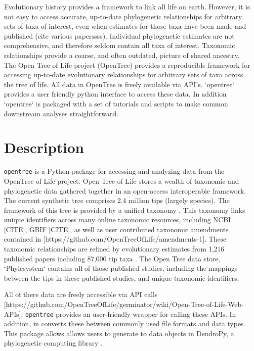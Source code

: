 \documentclass[oupdraft]{sysbio_sse}
\begin{document}
Evolutionary history provides a framework to link all life on earth. However, it is not easy to access accurate, up-to-date phylogenetic relationships for arbitrary sets of taxa of interest, even when estimates for those taxa have been made and published (cite various paperssss). Individual phylogenetic estimates are not comprehensive, and therefore seldom contain all taxa of interest. Taxonomic relationships provide a coarse, and often outdated, picture of shared ancestry. 
The Open Tree of Life project (OpenTree) provides a reproducible framework for accessing up-to-date evolutionary relationships for arbitrary sets of taxa across the tree of life.
All data in OpenTree is freely available via API's.
`opentree` provides a user friendly python interface to access these data. In addition `opentree` is packaged with a set of tutorials and scripts to make common downstream analyses straightforward.

\bigskip
\section{Description}
\label{sec2}

\texttt{opentree} is a Python package for accessing and analyzing data from the OpenTree of Life project.
Open Tree of Life stores a wealth of taxonomic and phylogenetic data gathered together in an open-access interoperable framework.
The current synthetic tree \citep{opentreeoflife_open_2019} comprises 2.4 million tips (largely species).
The framework of this tree is provided by a unified taxonomy \citep{opentreeoflife_open_2019-1, rees_automated_2017}.
This taxonomy links unique identifiers across many online taxonomic resources, including NCBI [CITE], GBIF [CITE], as well as user contributed taxonomic amendments contained in [https://github.com/OpenTreeOfLife/amendments-1].
These taxonomic relationships are refined by evolutionary estimates from 1,216 published papers including 87,000 tip taxa \citep{opentreeoflife_open_2019, redelings_supertree_2017}.
The Open Tree data store, `Phylesystem` \citep{mctavish_phylesystem:_2015} contains all of those published studies, including the mappings between the tips in these published studies, and unique taxonomic identifiers.

All of there data are freely accessible via API calls [https://github.com/OpenTreeOfLife/germinator/wiki/Open-Tree-of-Life-Web-APIs].
\texttt{opentree}  provides an user-friendly wrapper for calling these APIs.
In addition, in converts these between commonly used file formats and data types.
This package allows allows users to generate to data objects in DendroPy, a phylogenetic computing library \citep{sukumaran_dendropy_2010}.
\end{document}
